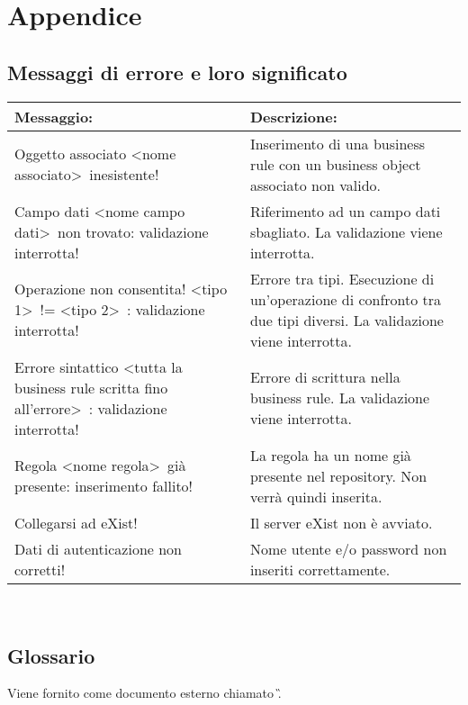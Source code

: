 \chapter{Appendice}
\section{Messaggi di errore e loro significato}
\begin{table}[htbp]
\begin{tabular}{||p{6.5cm}||p{6.5cm}||}
\hline
\textbf{Messaggio:} & \textbf{Descrizione:} \\ \hline
Oggetto associato \textless nome associato\textgreater\ inesistente! & Inserimento di una business rule con un business object associato non valido. \\ \hline
Campo dati \textless nome campo dati\textgreater\ non trovato: validazione interrotta! & Riferimento ad un campo dati sbagliato. La validazione viene interrotta. \\ \hline
Operazione non consentita! \textless tipo 1\textgreater\ != \textless tipo 2\textgreater\ : validazione interrotta! & Errore tra tipi. Esecuzione di un'operazione di confronto tra due tipi diversi. La validazione viene interrotta. \\ \hline
Errore sintattico \textless tutta la business rule scritta fino all'errore\textgreater\ : validazione interrotta! & Errore di scrittura nella business rule. La validazione viene interrotta. \\ \hline
Regola \textless nome regola\textgreater\  gi\`a presente: inserimento fallito! & La regola ha un nome gi\`a presente nel repository. Non verr\`a quindi inserita. \\ \hline
Collegarsi ad eXist! & Il server eXist non \`e avviato. \\ \hline
Dati di autenticazione non corretti! & Nome utente e/o password non inseriti correttamente. \\ \hline
\end{tabular} \\
\end{table}
\section{Glossario}
Viene fornito come documento esterno chiamato \G.


